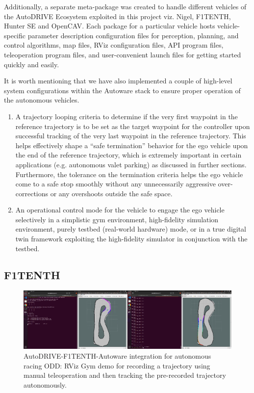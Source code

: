 Additionally, a separate meta-package was created to handle different vehicles of the AutoDRIVE Ecosystem exploited in this project viz. Nigel, F1TENTH, Hunter SE and OpenCAV. Each package for a particular vehicle hosts vehicle-specific parameter description configuration files for perception, planning, and control algorithms, map files, RViz configuration files, API program files, teleoperation program files, and user-convenient launch files for getting started quickly and easily.

It is worth mentioning that we have also implemented a couple of high-level system configurations within the Autoware stack to ensure proper operation of the autonomous vehicles.

\begin{enumerate}
    \item A trajectory looping criteria to determine if the very first waypoint in the reference trajectory is to be set as the target waypoint for the controller upon successful tracking of the very last waypoint in the reference trajectory. This helps effectively shape a ``safe termination'' behavior for the ego vehicle upon the end of the reference trajectory, which is extremely important in certain applications (e.g. autonomous valet parking) as discussed in further sections. Furthermore, the tolerance on the termination criteria helps the ego vehicle come to a safe stop smoothly without any unnecessarily aggressive over-corrections or any overshoots outside the safe space.
    \item An operational control mode for the vehicle to engage the ego vehicle selectively in a simplistic gym environment, high-fidelity simulation environment, purely testbed (real-world hardware) mode, or in a true digital twin framework exploiting the high-fidelity simulator in conjunction with the testbed.
\end{enumerate}

\hypertarget{F1TENTH}{%
\subsection{F1TENTH}\label{F1TENTH}}

\begin{figure}[H]
    \centering
    \includegraphics[width=\linewidth]{Figures/fig12.png}
    \caption{AutoDRIVE-F1TENTH-Autoware integration for autonomous racing ODD: RViz Gym demo for recording a trajectory using manual teleoperation and then tracking the pre-recorded trajectory autonomously.}
    \label{fig: figure12}
\end{figure}

